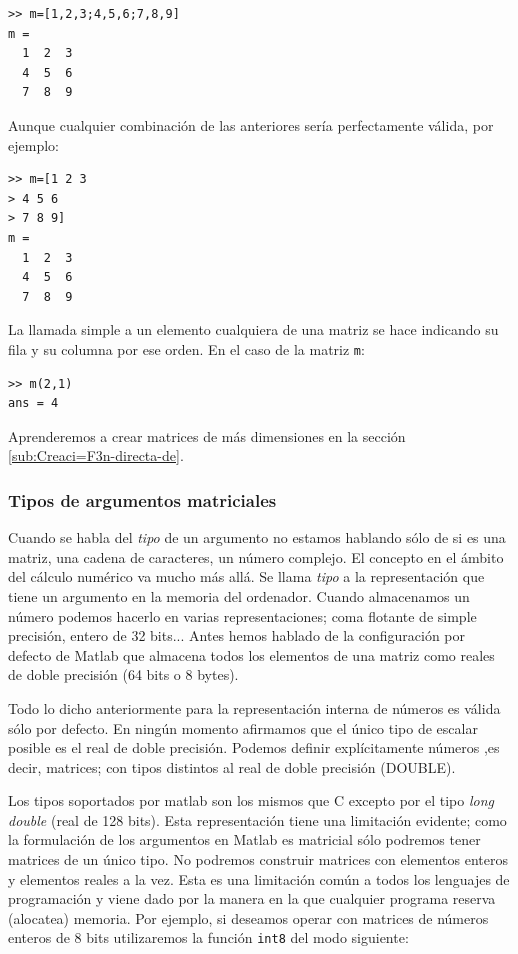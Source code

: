 \begin{verbatim}
>> m=[1,2,3;4,5,6;7,8,9]
m =
  1  2  3
  4  5  6
  7  8  9
\end{verbatim}
Aunque cualquier combinación de las anteriores sería perfectamente
válida, por ejemplo:

\begin{verbatim}
>> m=[1 2 3
> 4 5 6
> 7 8 9]
m =
  1  2  3
  4  5  6
  7  8  9
\end{verbatim}
La llamada simple a un elemento cualquiera de una matriz se hace
indicando su fila y su columna por ese orden. En el caso de la matriz
\texttt{m}:

\begin{verbatim}
>> m(2,1)
ans = 4
\end{verbatim}
Aprenderemos a crear matrices de más dimensiones en la sección
\ref{sub:Creaci=F3n-directa-de}.


\subsubsection{\label{argumentosmatriciales}Tipos de argumentos matriciales}

Cuando se habla del \emph{tipo} de un argumento no estamos hablando
sólo de si es una matriz, una cadena de caracteres, un número
complejo.  El concepto en el ámbito del cálculo numérico va mucho más
allá. Se llama \emph{tipo} a la representación que tiene un argumento
en la memoria del ordenador. Cuando almacenamos un número podemos
hacerlo en varias representaciones; coma flotante de simple precisión,
entero de 32 bits... Antes hemos hablado de la configuración por
defecto de Matlab que almacena todos los elementos de una matriz como
reales de doble precisión (64 bits o 8 bytes).

Todo lo dicho anteriormente para la representación interna de números
es válida sólo por defecto. En ningún momento afirmamos que el único
tipo de escalar posible es el real de doble precisión. Podemos definir
explícitamente números ,es decir, matrices; con tipos distintos al
real de doble precisión (DOUBLE).

Los tipos soportados por matlab son los mismos que C excepto por el
tipo \emph{long double} (real de 128 bits). Esta representación tiene
una limitación evidente; como la formulación de los argumentos en
Matlab es matricial sólo podremos tener matrices de un único tipo.  No
podremos construir matrices con elementos enteros y elementos reales a
la vez. Esta es una limitación común a todos los lenguajes de
programación y viene dado por la manera en la que cualquier programa
reserva (alocatea) memoria. Por ejemplo, si deseamos operar con
matrices de números enteros de 8 bits utilizaremos la función
\texttt{int8} del modo siguiente:

